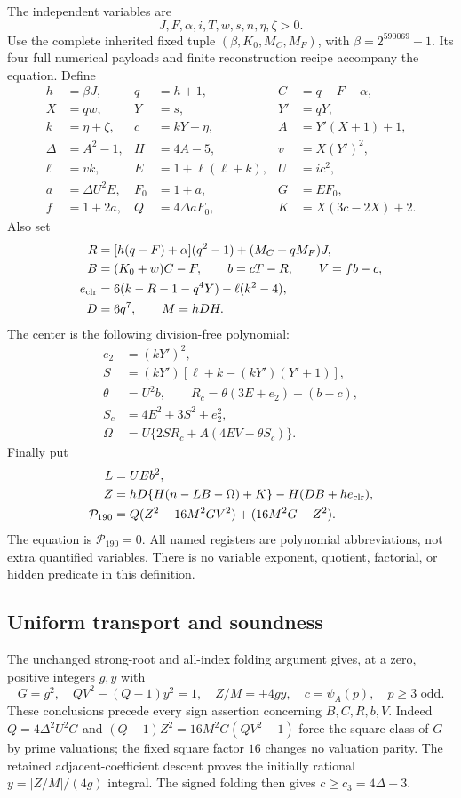 The independent variables are
\[
 J,F,\alpha,i,T,w,s,n,\eta,\zeta>0.
\]
Use the complete inherited fixed tuple $(\beta,K_0,M_C,M_F)$, with
$\beta=2^{590069}-1$.  Its four full numerical payloads and finite
reconstruction recipe accompany the equation.  Define
\begin{align*}
 h&=\beta J,&q&=h+1,&C&=q-F-\alpha,\\
 X&=qw,&Y&=s,&Y'&=qY,\\
 k&=\eta+\zeta,&c&=kY+\eta,&A&=Y'(X+1)+1,\\
 \Delta&=A^2-1,&H&=4A-5,&v&=X(Y')^2,\\
 \ell&=vk,&E&=1+\ell(\ell+k),&U&=ic^2,\\
 a&=\Delta U^2E,&F_0&=1+a,&G&=EF_0,\\
 f&=1+2a,&Q&=4\Delta aF_0,&K&=X(3c-2X)+2.
\end{align*}
Also set
\begin{align*}
 R&=[h(q-F)+\alpha](q^2-1)+(M_C+qM_F)J,\\
 B&=(K_0+w)C-F,\qquad b=cT-R,\qquad V=fb-c,\\
 e_{\rm clr}&=6(k-R-1-q^4Y)-\ell(k^2-4),\\
 D&=6q^7,\qquad M=hDH.
\end{align*}
The center is the following division-free polynomial:
\begin{align*}
 e_2&=(kY')^2,\\
 S&=(kY')[\ell+k-(kY')(Y'+1)],\\
 \theta&=U^2b,\qquad R_c=\theta(3E+e_2)-(b-c),\\
 S_c&=4E^2+3S^2+e_2^2,\\
 \Omega&=U\{2SR_c+A(4EV-\theta S_c)\}.
\end{align*}
Finally put
\begin{align*}
 L&=UEb^2,\\
 Z&=hD\{H(n-LB-\Omega)+K\}-H(DB+h e_{\rm clr}),\\
 \mathcal P_{190}&=Q(Z^2-16M^2GV^2)+(16M^2G-Z^2).
\end{align*}
The equation is $\mathcal P_{190}=0$.  All named registers are
polynomial abbreviations, not extra quantified variables.  There is no
variable exponent, quotient, factorial, or hidden predicate in this
definition.

\subsection{Uniform transport and soundness}

The unchanged strong-root and all-index folding argument gives, at a zero,
positive integers $g,y$ with
\[
 G=g^2,\quad QV^2-(Q-1)y^2=1,\quad Z/M=\pm4gy,
 \quad c=\psi_A(p),\quad p\ge3\text{ odd}.
\]
These conclusions precede every sign assertion concerning $B,C,R,b,V$.
Indeed $Q=4\Delta^2U^2G$ and
$(Q-1)Z^2=16M^2G(QV^2-1)$ force the square class of $G$ by prime
valuations; the fixed square factor $16$ changes no valuation parity.
The retained adjacent-coefficient descent proves the initially rational
$y=|Z/M|/(4g)$ integral.  The signed folding then gives
$c\ge c_3=4\Delta+3$.

